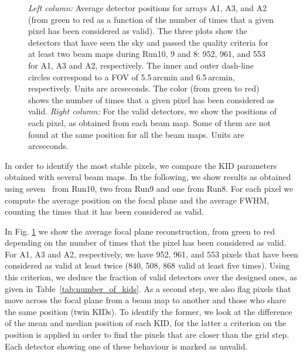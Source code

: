 \begin{figure}[p]
\begin{center}
\caption[KID selection and stability of position in the FOV]{\emph{Left column:}
  Average detector positions for arrays A1, A3, and A2 (from green to red as a
  function of the number of times that a given pixel has been considered as
  valid). The three plots show the detectors that have seen the sky and passed
  the quality criteria for at least two beam maps during Run10, 9 and 8: 952,
  961, and 553 for A1, A3 and A2, respectively. The inner and outer dash-line
  circles correspond to a FOV of 5.5\,arcmin and 6.5\,arcmin,
  respectively. Units are arcseconds.  The color (from green to red) shows the
  number of times that a given pixel has been considered as valid. \emph{Right
    column:}
For the valid
  detectors, we show the positions of each pixel, as obtained from each beam
  map. Some of them are not found at the same position for all the beam
  maps. Units are arcseconds. }
\label{fig:avg_fov_color}
\end{center}
\end{figure}

In order to identify the most stable pixels, we compare the KID parameters
obtained with several beam maps.  In the following, we show results as obtained
using seven \bms\ from Run10, two from Run9 and one from Run8.  For each
pixel we compute the average position on the focal plane and the average FWHM,
counting the times that it has been considered as valid.

In Fig. \ref{fig:avg_fov_color} we show the average focal plane
reconstruction, from green to red depending on the number of times
that the pixel has been considered as valid. For A1, A3 and A2,
respectively, we have 952, 961, and 553 pixels that have been
considered as valid at least twice (840, 508, 868 valid at least five
times).
Using this criterion, we deduce the fraction of valid detectors over the
designed ones, as given in Table~\ref{tab:number_of_kids}.  As a second step, we
also flag pixels that move across the focal plane from a beam map to another
and those who share the same
position (twin KIDs). To identify the former, we look at the difference of the
mean and median position of each KID, for the latter a criterion on the position
is applied in order to find the pixels that are closer than the grid step. Each
detector showing one of these behaviour is marked as unvalid.

